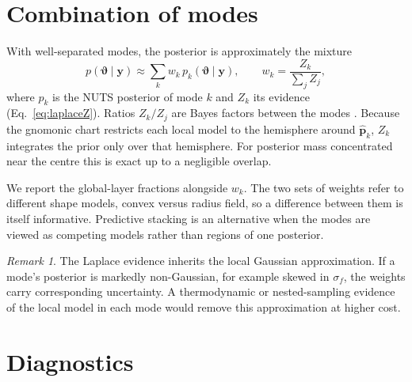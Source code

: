 \documentclass[11pt,a4paper]{article}
\theoremstyle{remark}
\newtheorem{remark}{Remark}
\newcommand{\vect}[1]{\bm{#1}}
\newcommand{\uv}[1]{\hat{\bm{#1}}}
\begin{document}
\section{Combination of modes}
\label{sec:mixture}

With well-separated modes, the posterior is approximately the mixture
\begin{equation}
  p(\vect\vartheta\mid\vect y)\approx\sum_kw_k\,p_k(\vect\vartheta\mid\vect y),\qquad
  w_k=\frac{Z_k}{\sum_jZ_j},
  \label{eq:mixture}
\end{equation}
where $p_k$ is the NUTS posterior of mode $k$ and $Z_k$ its evidence (Eq.~\ref{eq:laplaceZ}). Ratios
$Z_k/Z_j$ are Bayes factors between the modes \citep{kass1995}. Because the gnomonic chart restricts each
local model to the hemisphere around $\uv p_k$, $Z_k$ integrates the prior only over that hemisphere.
For posterior mass concentrated near the centre this is exact up to a negligible overlap.

We report the global-layer fractions alongside $w_k$. The two sets of weights refer to different shape
models, convex versus radius field, so a difference between them is itself informative. Predictive
stacking \citep{yao2018} is an alternative when the modes are viewed as competing models rather than
regions of one posterior.

\begin{remark}
The Laplace evidence inherits the local Gaussian approximation. If a mode's posterior is markedly
non-Gaussian, for example skewed in $\sigma_f$, the weights carry corresponding uncertainty. A
thermodynamic or nested-sampling evidence of the local model in each mode would remove this
approximation at higher cost.
\end{remark}

\section{Diagnostics}
\label{sec:diagnostics}
\end{document}
